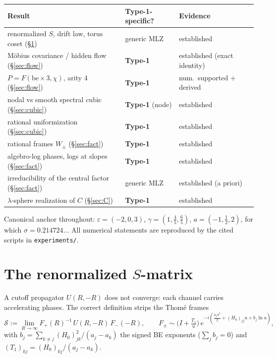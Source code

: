 \documentclass[11pt]{article}
\theoremstyle{definition}
\theoremstyle{remark}
\newcommand{\eps}{\varepsilon}
\newcommand{\Scat}{\mathcal{S}}
\newcommand{\be}{\mathrm{be}}
\begin{document}
\begin{center}
\small
\begin{tabular}{lll}
\toprule
Result & Type-1-specific? & Evidence \\
\midrule
renormalized $S$, drift law, torus coset (\S\ref{sec:renorm}) & generic MLZ & established \\
M\"obius covariance / hidden flow (\S\ref{sec:flow}) & \textbf{Type-1} & established (exact identity) \\
$P=F(\be\times3,\chi)$, arity 4 (\S\ref{sec:flow}) & \textbf{Type-1} & num.\ supported + derived \\
nodal vs smooth spectral cubic (\S\ref{sec:cubic}) & \textbf{Type-1} (node) & established \\
rational uniformization (\S\ref{sec:cubic}) & \textbf{Type-1} & established \\
rational frames $W_\pm$ (\S\ref{sec:fact}) & \textbf{Type-1} & established \\
algebro-log phases, logs at slopes (\S\ref{sec:fact}) & \textbf{Type-1} & established \\
irreducibility of the central factor (\S\ref{sec:fact}) & generic MLZ & established (a priori) \\
$\lambda$-sphere realization of $C$ (\S\ref{sec:C}) & \textbf{Type-1} & established \\
\bottomrule
\end{tabular}
\end{center}

Canonical anchor throughout: $\eps=(-2,0,3)$, $\gamma=(1,\tfrac45,\tfrac65)$,
$a=(-1,\tfrac12,2)$, for which $\sigma=0.214724\ldots$ All numerical statements are
reproduced by the cited scripts in \texttt{experiments/}.

\section{The renormalized $S$-matrix}\label{sec:renorm}

A cutoff propagator $U(R,-R)$ does not converge: each channel carries accelerating
phases. The correct definition strips the Thom\'e frames \cite{Wasow1965}
\begin{equation}\label{eq:Sdef}
\Scat:=\lim_{R\to\infty}F_+(R)^{-1}\,U(R,-R)\,F_-(-R),\qquad
F_\pm\sim\Big(I+\tfrac{T_1}{u}\Big)\,
e^{-i\left(\frac{a_ju^2}{2}+(H_0)_{jj}u+b_j\ln u\right)},
\end{equation}
with $b_j=\sum_{k\neq j}(H_0)_{jk}^2/(a_j-a_k)$ the signed BE exponents
($\sum_jb_j=0$) and $(T_1)_{kj}=(H_0)_{kj}/(a_j-a_k)$.
\end{document}
